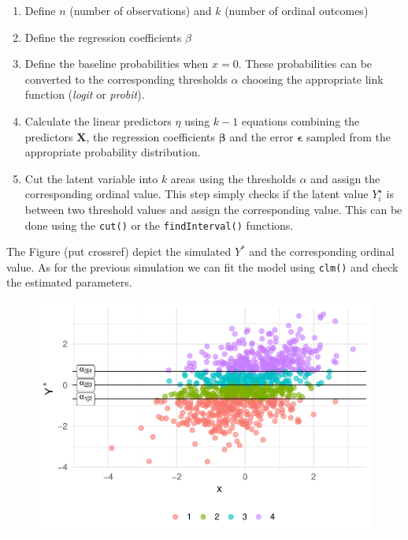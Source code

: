 \documentclass[
  man,floatsintext]{apa6}
\providecommand{\tightlist}{%
  \setlength{\itemsep}{0pt}\setlength{\parskip}{0pt}}
\begin{document}
\begin{enumerate}
\def\labelenumi{\arabic{enumi}.}
\tightlist
\item
  Define \(n\) (number of observations) and \(k\) (number of ordinal outcomes)
\item
  Define the regression coefficients \(\beta\)
\item
  Define the baseline probabilities when \(x = 0\). These probabilities can be converted to the corresponding thresholds \(\alpha\) choosing the appropriate link function (\emph{logit} or \emph{probit}).
\item
  Calculate the linear predictors \(\eta\) using \(k - 1\) equations combining the predictors \(\mathbf{X}\), the regression coefficients \(\mathbf{\beta}\) and the error \(\mathbf{\epsilon}\) sampled from the appropriate probability distribution.
\item
  Cut the latent variable into \(k\) areas using the thresholds \(\alpha\) and assign the corresponding ordinal value. This step simply checks if the latent value \(Y^{\star}_i\) is between two threshold values and assign the corresponding value. This can be done using the \texttt{cut()} or the \texttt{findInterval()} functions.
\end{enumerate}

\scriptsize

\normalsize

The Figure (put crossref) depict the simulated \(Y^{*}\) and the corresponding ordinal value. As for the previous simulation we can fit the model using \texttt{clm()} and check the estimated parameters.

\scriptsize

\begin{figure}

{\centering \includegraphics{paper-new_files/figure-latex/unnamed-chunk-12-1} 

}

\caption{ }\label{fig:unnamed-chunk-12}
\end{figure}
\end{document}
